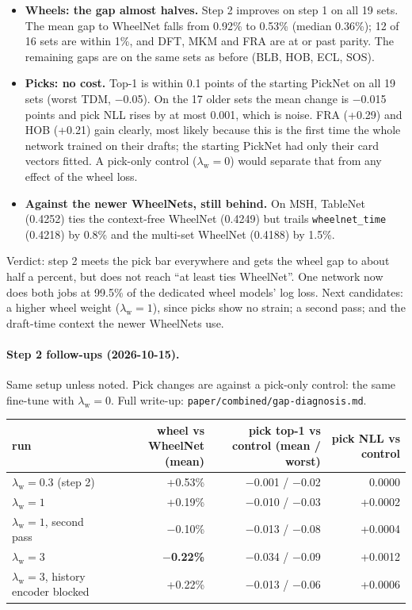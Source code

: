 \documentclass[11pt,letterpaper]{article}
\newcommand{\code}[1]{\texttt{\small #1}}
\begin{document}
\begin{itemize}
\item \textbf{Wheels: the gap almost halves.} Step 2 improves on step 1 on all 19 sets. The mean gap to
WheelNet falls from 0.92\% to 0.53\% (median 0.36\%); 12 of 16 sets are within 1\%, and DFT, MKM and FRA are at
or past parity. The remaining gaps are on the same sets as before (BLB, HOB, ECL, SOS).
\item \textbf{Picks: no cost.} Top-1 is within 0.1 points of the starting PickNet on all 19 sets (worst TDM,
$-$0.05). On the 17 older sets the mean change is $-$0.015 points and pick NLL rises by at most 0.001, which is
noise. FRA (+0.29) and HOB (+0.21) gain clearly, most likely because this is the first time the whole network
trained on their drafts; the starting PickNet had only their card vectors fitted. A pick-only control
($\lambda_{\text{w}}=0$) would separate that from any effect of the wheel loss.
\item \textbf{Against the newer WheelNets, still behind.} On MSH, TableNet (0.4252) ties the context-free
WheelNet (0.4249) but trails \code{wheelnet\_time} (0.4218) by 0.8\% and the multi-set WheelNet (0.4188) by 1.5\%.
\end{itemize}

\noindent Verdict: step 2 meets the pick bar everywhere and gets the wheel gap to about half a percent, but
does not reach ``at least ties WheelNet''. One network now does both jobs at 99.5\% of the dedicated wheel
models' log loss. Next candidates: a higher wheel weight ($\lambda_{\text{w}}=1$), since picks show no strain;
a second pass; and the draft-time context the newer WheelNets use.

\paragraph{Step 2 follow-ups (2026-10-15).} Same setup unless noted. Pick changes are against a pick-only
control: the same fine-tune with $\lambda_{\text{w}}=0$. Full write-up: \code{paper/combined/gap-diagnosis.md}.

\begin{center}\small
\begin{tabular}{lrrr}
\toprule
run & wheel vs WheelNet (mean) & pick top-1 vs control (mean / worst) & pick NLL vs control \\
\midrule
$\lambda_{\text{w}}=0.3$ (step 2) & +0.53\% & $-$0.001 / $-$0.02 & 0.0000 \\
$\lambda_{\text{w}}=1$ & +0.19\% & $-$0.010 / $-$0.03 & +0.0002 \\
$\lambda_{\text{w}}=1$, second pass & $-$0.10\% & $-$0.013 / $-$0.08 & +0.0004 \\
$\lambda_{\text{w}}=3$ & \textbf{$-$0.22\%} & $-$0.034 / $-$0.09 & +0.0012 \\
$\lambda_{\text{w}}=3$, history encoder blocked & +0.22\% & $-$0.013 / $-$0.06 & +0.0006 \\
\bottomrule
\end{tabular}
\end{center}
\end{document}
